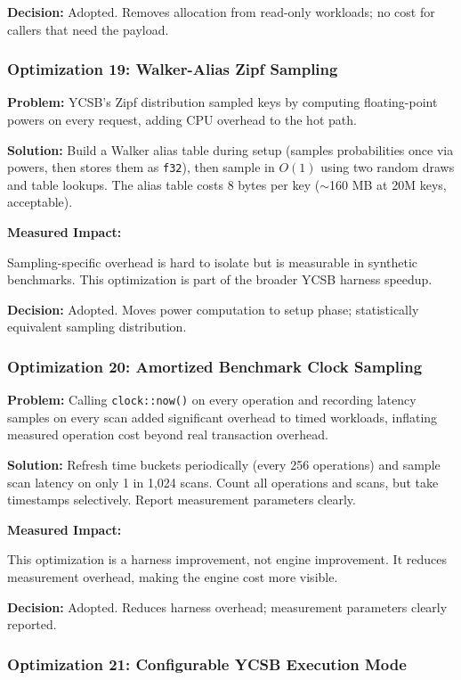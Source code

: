 \documentclass[11pt]{article}
\newcommand{\code}[1]{\texttt{#1}}
\begin{document}
\textbf{Decision:} Adopted. Removes allocation from read-only workloads; no cost for
callers that need the payload.

\subsubsection{Optimization 19: Walker-Alias Zipf Sampling}

\textbf{Problem:}
YCSB's Zipf distribution sampled keys by computing floating-point powers on every request,
adding CPU overhead to the hot path.

\textbf{Solution:}
Build a Walker alias table during setup (samples probabilities once via powers, then
stores them as \code{f32}), then sample in $O(1)$ using two random draws and table lookups.
The alias table costs 8 bytes per key ($\sim$160 MB at 20M keys, acceptable).

\textbf{Measured Impact:}

Sampling-specific overhead is hard to isolate but is measurable in synthetic benchmarks.
This optimization is part of the broader YCSB harness speedup.

\textbf{Decision:} Adopted. Moves power computation to setup phase; statistically
equivalent sampling distribution.

\subsubsection{Optimization 20: Amortized Benchmark Clock Sampling}

\textbf{Problem:}
Calling \code{clock::now()} on every operation and recording latency samples on every
scan added significant overhead to timed workloads, inflating measured operation cost
beyond real transaction overhead.

\textbf{Solution:}
Refresh time buckets periodically (every 256 operations) and sample scan latency on
only 1 in 1,024 scans. Count all operations and scans, but take timestamps selectively.
Report measurement parameters clearly.

\textbf{Measured Impact:}

This optimization is a harness improvement, not engine improvement. It reduces
measurement overhead, making the engine cost more visible.

\textbf{Decision:} Adopted. Reduces harness overhead; measurement parameters clearly
reported.

\subsubsection{Optimization 21: Configurable YCSB Execution Mode}
\end{document}
